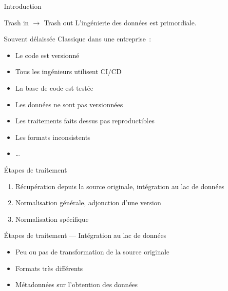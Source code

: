 \begin{frame}{Introduction}
  \begin{alertblock}{Trash in $\rightarrow$ Trash out}
    L'ingénierie des données est primordiale.
  \end{alertblock}
\end{frame}

\begin{frame}{Souvent délaissée}
  Classique dans une entreprise~:

  \begin{itemize}[<+->]
    \item Le code est versionné
    \item Tous les ingénieurs utilisent CI/CD
    \item La base de code est testée
  \end{itemize}


  \begin{itemize}[<+->]
    \item Les données ne sont pas versionnées
    \item Les traitements faits dessus pas reproductibles
    \item Les formats inconsistents
    \item …
  \end{itemize}

\end{frame}

\begin{frame}{Étapes de traitement}
  \begin{enumerate}[<+->]
    \item Récupération depuis la source originale, intégration au lac de données
    \item Normalisation générale, adjonction d'une version
    \item Normalisation spécifique
  \end{enumerate}  
\end{frame}

\begin{frame}{Étapes de traitement --- Intégration au lac de données}
  \begin{itemize}[<+->]
    \item Peu ou pas de transformation de la source originale
    \item Formats très différents
    \item Métadonnées sur l'obtention des données
  \end{itemize}  
\end{frame}

